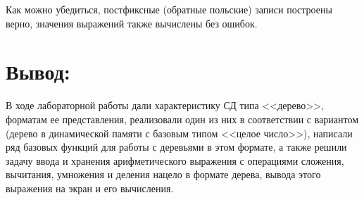 \documentclass[12pt]{article}
\begin{document}
{	Как можно убедиться, постфиксные (обратные польские) записи построены верно, значения выражений также вычислены без ошибок.
	
	\section{Вывод:}
	
	В ходе лабораторной работы дали характеристику СД типа <<дерево>>, форматам ее представления, реализовали один из них в соответствии с вариантом (дерево в динамической памяти с базовым типом <<целое число>>), написали ряд базовых функций для работы с деревьями в этом формате, а также решили задачу ввода и хранения арифметического выражения с операциями сложения, вычитания, умножения и деления нацело в формате дерева, вывода этого выражения на экран и его вычисления.
}
\end{document}
